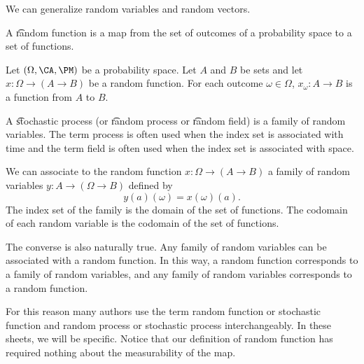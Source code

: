 

We can generalize random variables and random vectors.


A \t{random function} is a map from the set of outcomes of a probability space to a set of functions.

Let $(\Omega, \CA, \PM)$ be a probability space.
Let $A$ and $B$ be sets and let $x: \Omega \to (A \to B)$ be a random function.
For each outcome $\omega \in \Omega$, $x_{\omega}: A \to B$ is a function from $A$ to $B$.


A \t{stochastic process} (or \t{random process} or \t{random field}) is a family of random variables.
The term process is often used when the index set is associated with time and the term field is often used when the index set is associated with space.

We can associate to the random function $x: \Omega \to (A \to B)$ a family of random variables $y: A \to (\Omega \to B)$ defined by
\[
  y(a)(\omega) = x(\omega)(a).
\]
The index set of the family is the domain of the set of functions.
The codomain of each random variable is the codomain of the set of functions.

The converse is also naturally true.
Any family of random variables can be associated with a random function.
In this way, a random function corresponds to a family of random variables, and any family of random variables corresponds to a random function.

For this reason many authors use the term random function or stochastic function and random process or stochastic process interchangeably.
In these sheets, we will be specific.
Notice that our definition of random function has required nothing about the measurability of the map.

\blankpage
